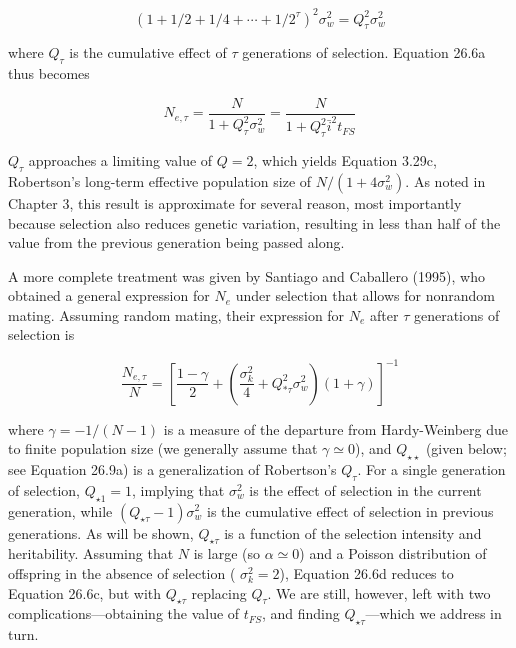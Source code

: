 \documentclass{article}
\begin{document}
\begin{equation}
(1+1/2+1/4+\cdots+1/2^{\tau})^{2}\sigma_{w}^{2}=Q_{\tau}^{2}\sigma_{w}^{2}
\end{equation}

where  $ Q_{\tau} $ is the cumulative effect of  $ \tau $ generations of selection. Equation 26.6a thus becomes

\begin{equation}
N_{e,\tau}=\frac{N}{1+Q_{\tau}^{2}\sigma_{w}^{2}}=\frac{N}{1+Q_{\tau}^{2}\bar{i}^{2}t_{FS}}
\tag{26.6c}
\label{eq:26_6c}
\end{equation}

 $ Q_{\tau} $ approaches a limiting value of  $ Q = 2 $, which yields Equation 3.29c, Robertson's long-term effective population size of  $ N/(1+4\sigma_{w}^2) $. As noted in Chapter 3, this result is approximate for several reason, most importantly because selection also reduces genetic variation, resulting in less than half of the value from the previous generation being passed along.

A more complete treatment was given by Santiago and Caballero (1995), who obtained a general expression for  $ N_{e} $ under selection that allows for nonrandom mating. Assuming random mating, their expression for  $ N_{e} $ after  $ \tau $ generations of selection is

\begin{equation}
\frac{N_{e,\tau}}{N}=\left[\frac{1-\gamma}{2}+\left(\frac{\sigma_{k}^{2}}{4}+Q_{*\tau}^{2}\sigma_{w}^{2}\right)(1+\gamma)\right]^{-1}
\tag{26.6d}
\label{eq:26_6d}
\end{equation}

where  $ \gamma = -1/(N - 1) $ is a measure of the departure from Hardy-Weinberg due to finite population size (we generally assume that  $ \gamma \simeq 0 $), and  $ Q_{\star\star} $ (given below; see Equation 26.9a) is a generalization of Robertson's  $ Q_{\tau} $. For a single generation of selection,  $ Q_{\star1} = 1 $, implying that  $ \sigma_w^2 $ is the effect of selection in the current generation, while  $ (Q_{\star\tau} - 1)\sigma_w^2 $ is the cumulative effect of selection in previous generations. As will be shown,  $ Q_{\star\tau} $ is a function of the selection intensity and heritability. Assuming that  $ N $ is large (so  $ \alpha \simeq 0 $) and a Poisson distribution of offspring in the absence of selection ( $ \sigma_k^2 = 2 $), Equation 26.6d reduces to Equation 26.6c, but with  $ Q_{\star\tau} $ replacing  $ Q_\tau $. We are still, however, left with two complications—obtaining the value of  $ t_{FS} $, and finding  $ Q_{\star\tau} $—which we address in turn.
\end{document}
